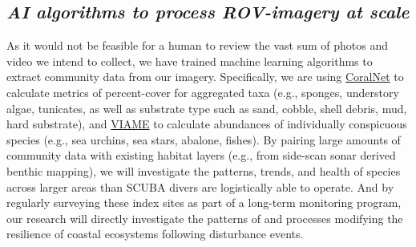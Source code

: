 \documentclass[11pt]{article}
\begin{document}
\subsection{\textit{AI algorithms to process ROV-imagery at scale}}
As it would not be feasible for a human to review the vast sum of 
photos and video we intend to collect, we have trained machine learning 
algorithms to extract community data from our imagery. 
Specifically, we are using \href{https://coralnet.ucsd.edu/}{CoralNet} 
\cite{Williams2019} to calculate metrics of percent-cover for 
aggregated taxa (e.g., sponges, understory algae, tunicates, as well as 
substrate type such as sand, cobble, shell debris, mud, hard 
substrate), and 
\href{https://www.star.nesdis.noaa.gov/star/documents/meetings/2020AI/presentations/202008/20200827_Dawkins.pdf}{VIAME}
 \cite{Dawkins2017} to calculate abundances of individually conspicuous 
 species (e.g., sea urchins, sea stars, abalone, fishes). 
By pairing large amounts of community data with existing habitat layers 
(e.g., from side-scan sonar derived benthic mapping), we will 
investigate the patterns, trends, and health of species across larger 
areas than SCUBA divers are logistically able to operate. 
And by regularly surveying these index sites as part of a long-term 
monitoring program, our research will directly investigate the patterns 
of and processes modifying the resilience of coastal ecosystems 
following disturbance events. 
	
\end{document}
